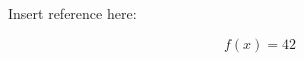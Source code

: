 \documentclass{article}
\begin{document}
Insert reference here:

\begin{equation}
  f(x) = 42
  \label{eq:main-is-working}
\end{equation}




\end{document}
